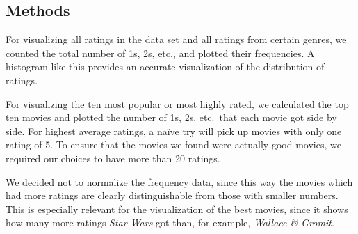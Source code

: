 \subsection{Methods}
For visualizing all ratings in the data set and all ratings from certain genres, we counted the total number of 1s, 2s, etc., and plotted their frequencies. A histogram like this provides an accurate visualization of the distribution of ratings. 

For visualizing the ten most popular or most highly rated, we calculated the top ten movies and plotted the number of 1s, 2s, etc.\ that each movie got side by side.  For highest average ratings, a na\"{i}ve try will pick up movies with only one rating of 5.  To ensure that the movies we found were actually good movies, we required our choices to have more than 20 ratings.

We decided not to normalize the frequency data, since this way the movies which had more ratings are clearly distinguishable from those with smaller numbers.  This is especially relevant for the visualization of the best movies, since it shows how many more ratings \emph{Star Wars} got than, for example, \emph{Wallace \& Gromit}.

